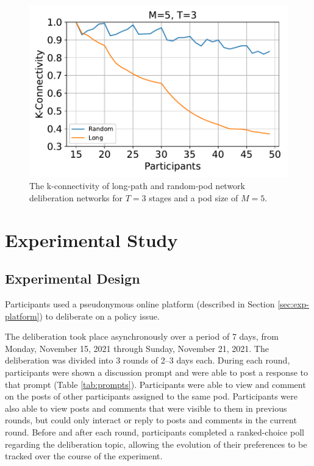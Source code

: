 \begin{figure}
\center
\includegraphics[width=5in]{chapters/figures/NetDelibExp/fig-kcon}
\caption{The k-connectivity of long-path and random-pod network deliberation
networks for $T=3$ stages and a pod size of $M=5$.}
\label{fig:kcon}
\end{figure}


\section{Experimental Study}
\label{sec:experiment}

\subsection{Experimental Design}

Participants used a pseudonymous online platform (described in Section \ref{sec:exp-platform}) to deliberate on a policy issue.

The deliberation took place asynchronously over a period of 7 days, from Monday, November 15, 2021 through Sunday, November 21, 2021.
The deliberation was divided into 3 rounds of 2--3 days each.
During each round, participants were shown a discussion prompt and were able to post a response to that prompt (Table \ref{tab:prompts}).
Participants were able to view and comment on the posts of other participants assigned to the same pod.
Participants were also able to view posts and comments that were visible to them in previous rounds, but could only interact or reply to posts and comments in the current round.
Before and after each round, participants completed a ranked-choice poll regarding the deliberation topic, allowing the evolution of their preferences to be tracked over the course of the experiment.

